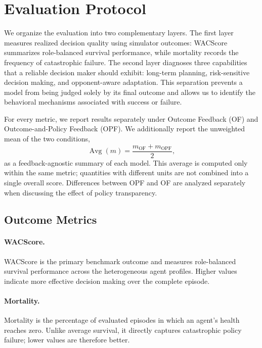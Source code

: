 \documentclass[letterpaper]{article} %
\begin{document}
\section{Evaluation Protocol}

We organize the evaluation into two complementary layers. The
first layer measures realized decision quality using simulator
outcomes: WACScore summarizes role-balanced survival performance,
while mortality records the frequency of catastrophic failure. The
second layer diagnoses three capabilities that a reliable decision
maker should exhibit: long-term planning, risk-sensitive decision
making, and opponent-aware adaptation. This separation prevents a
model from being judged solely by its final outcome and allows us to
identify the behavioral mechanisms associated with success or failure.

For every metric, we report results separately under Outcome Feedback
(OF) and Outcome-and-Policy Feedback (OPF). We additionally report the
unweighted mean of the two conditions,
\begin{equation}
    \operatorname{Avg}(m)
    =
    \frac{m_{\mathrm{OF}}+m_{\mathrm{OPF}}}{2},
\end{equation}
as a feedback-agnostic summary of each model. This average is computed
only within the same metric; quantities with different units are not
combined into a single overall score. Differences between OPF and OF
are analyzed separately when discussing the effect of policy
transparency.

\subsection{Outcome Metrics}

\paragraph{WACScore.}
WACScore is the primary benchmark outcome and measures role-balanced
survival performance across the heterogeneous agent profiles. Higher
values indicate more effective decision making over the complete
episode.

\paragraph{Mortality.}
Mortality is the percentage of evaluated episodes in which an agent's
health reaches zero. Unlike average survival, it directly captures
catastrophic policy failure; lower values are therefore better.
\end{document}
